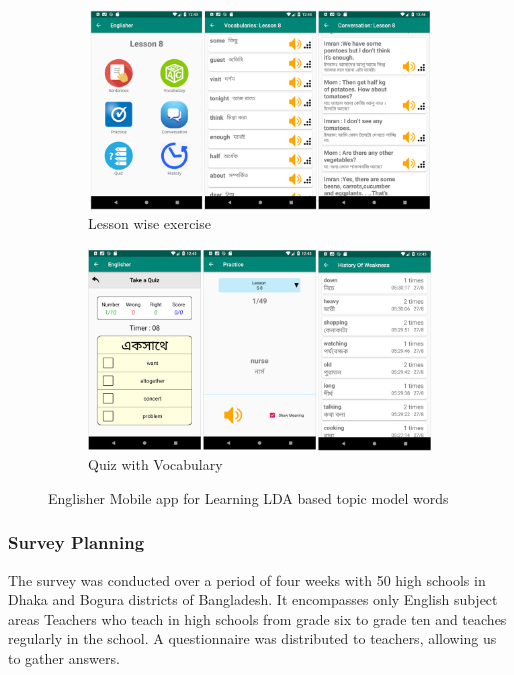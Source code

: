\documentclass[sn-mathphys,Numbered]{sn-jnl}%
\theoremstyle{thmstyleone}%
\theoremstyle{thmstyletwo}%
\theoremstyle{thmstylethree}%
\begin{document}
\begin{figure}[h!]
\centering
\begin{subfigure}{\textwidth}
	\centering
    \includegraphics[width=\textwidth]{mobile_app_01.png}
    \caption{Lesson wise exercise}
    \label{fig:first}
\end{subfigure}
\hfill
\begin{subfigure}{\textwidth}
	\centering
    \includegraphics[width=\textwidth]{mobile_app_02.png}
    \caption{Quiz with Vocabulary}
    \label{fig:second}
\end{subfigure}
        
\caption{Englisher Mobile app for Learning LDA based topic model words}
\label{fig:figures}
\end{figure}

\subsubsection{Survey Planning} The survey was conducted over a period of four weeks with 50 high schools in Dhaka and Bogura districts of Bangladesh. It encompasses only English subject areas Teachers who teach in high schools from grade six to grade ten and teaches regularly in the school. A questionnaire was distributed to teachers, allowing us to gather answers. 
\end{document}
